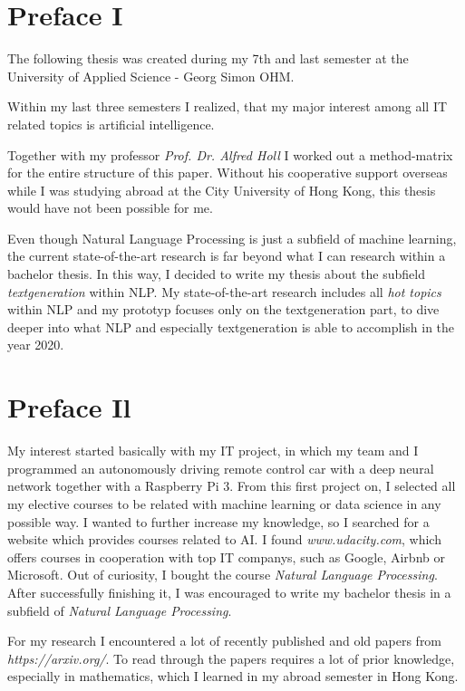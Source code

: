 \thispagestyle{empty}
\section*{Preface I}
\label{sec:prolog_1}

The following thesis was created during my 7th and last semester at the University of Applied Science - Georg Simon OHM. 

Within my last three semesters I realized, that my major interest among all IT related topics is artificial intelligence.

Together with my professor \textit{Prof. Dr. Alfred Holl} I worked out a method-matrix for the entire structure of this paper. Without his cooperative support overseas while I was studying abroad at the City University of Hong Kong, this thesis would have not been possible for me.

Even though Natural Language Processing is just a subfield of machine learning, the current state-of-the-art research is far beyond what I can research within a bachelor thesis. In this way, I decided to write my thesis about the subfield \textit{textgeneration} within NLP. My state-of-the-art research includes all \textit{hot topics} within NLP and my prototyp focuses only on the textgeneration part, to dive deeper into what NLP and especially textgeneration is able to accomplish in the year 2020.

\newpage

\section*{Preface Il}
\label{sec:prolog_2}

My interest started basically with my IT project, in which my team and I programmed an autonomously driving remote control car with a deep neural network together with a Raspberry Pi 3. From this first project on, I selected all my elective courses to be related with machine learning or data science in any possible way. I wanted to further increase my knowledge, so I searched for a website which provides courses related to AI. I found \textit{www.udacity.com}, which offers courses  in cooperation with top IT companys, such as Google, Airbnb or Microsoft. Out of curiosity, I bought the course \textit{Natural Language Processing}. After successfully finishing it, I was encouraged to write my bachelor thesis in a subfield of \textit{Natural Language Processing}. 

For my research I encountered a lot of recently published and old papers from \textit{https://arxiv.org/}. To read through the papers requires a lot of prior knowledge, especially in mathematics, which I learned in my abroad semester in Hong Kong. 

